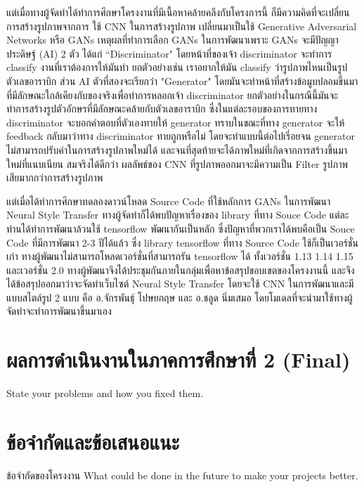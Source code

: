 \documentclass[12pt,oneside,openright,a4paper]{cpe-thai-project}
\begin{document}
\par\setlength{\parindent}{5ex}
แต่เมื่อทางผู้จัดทำได้ทำการศึกษาโครงงานที่มีเนื้อหาคล้ายคลึงกับโครงการนี้ ก็มีความคิดที่จะเปลี่ยนการสร้างรูปภาพจากการ ใช้ CNN ในการสร้างรูปภาพ เปลี่ยนมาเป็นใช้  Generative Adversarial Networks หรือ GANs เหตุผลที่ทำการเลือก GANs ในการพัฒนาเพราะ GANs จะมีปัญญาประดิษฐ์ (AI) 2 ตัว ได้แก่ “Discriminator" โดยหน้าที่ของเจ้า discriminator จะทำการ classify งานที่เราต้องการให้มันทำ ยกตัวอย่างเช่น เราอยากให้มัน classify ว่ารูปภาพไหนเป็นรูปตัวเลขอาราบิก ส่วน AI ตัวที่สองจะเรียกว่า "Generator" โดยมันจะทำหน้าที่สร้างข้อมูบปลอมขึ้นมาที่มีลักษณะใกล้เคียงกับของจริงเพื่อทำการหลอกเจ้า
discriminator ยกตัวอย่างในกรณีนี้มันจะทำการสร้างรูปตัวอักษรที่มีลักษณะคล้ายกับตัวเลขอาราบิก ซึ่งในแต่ละรอบของการทายทาง discriminator จะบอกคำตอบที่ตัวเองทายให้ \newline
generator ทราบในขณะที่ทาง generator จะให้ feedback กลับมาว่าทาง discriminator ทายถูกหรือไม่ โดยจะทำแบบนี้ต่อไปเรี่อยจน generator ไม่สามารถปรับค่าในการสร้างรูปภาพใหม่ได้ และจนที่สุดท้ายจะได้ภาพใหม่ที่เกิดจากการสร้างขึ้นมาใหม่ที่แนบเนียน สมจริงได้ดีกว่า ผลลัพธ์ของ CNN ที่รูปภาพออกมาจะมีความเป็น Filter รูปภาพเสียมากกว่าการสร้างรูปภาพ 

\par\setlength{\parindent}{5ex}
แต่เมื่อได้ทำการศึกษาทดลองดาวน์โหลด Source Code ที่ใช้หลักการ GANs ในการพัฒนา Neural Style Transfer ทางผู้จัดทำก็ได้พบปัญหาเรื่องของ library ที่ทาง Souce  Code แต่ละท่านได้ทำการพัฒนาล้วนใช้ tensorflow พัฒนากันเป็นหลัก ซึ่งปัญหาที่พวกเราได้พบคือเป็น Souce Code ที่มีการพัฒนา 2-3 ปีได้แล้ว ซึ่ง library tensorflow ที่ทาง Source Code ใช้ก็เป็นเวอร์ชั่นเก่า ทางผู้พัฒนาไม่สามารถโหลดเวอร์ชั่นที่สามารถรัน tensorflow ได้ ทั้งเวอร์ชั่น 1.13 1.14 1.15 และเวอร์ชั่น 2.0 ทางผู้พัฒนาจึงได้ประชุมกันภายในกลุ่มเพื่อหาข้อสรุปขอบเขตของโครงงานนี้ และจึงได้ข้อสรุปออกมาว่าจะจัดทำเว็บไซต์ Neural Style Transfer โดยจะใช้ CNN ในการพัฒนาและมีแบบสไตล์รูป 2 แบบ คือ อ.จักรพันธุ์ โปษยกฤษ และ อ.ชลูด นิ่มเสมอ โดยโมเดลที่จะนำมาใช้ทางผู้จัดทำจะทำการพัฒนาขึ้นมาเอง


\section{ผลการดำเนินงานในภาคการศึกษาที่ 2 (Final) }
State your problems and how you fixed them.

\section{ข้อจำกัดและข้อเสนอแนะ}
ข้อจำกัดของโครงงาน What could be done in the future to make your projects better.
\end{document}
